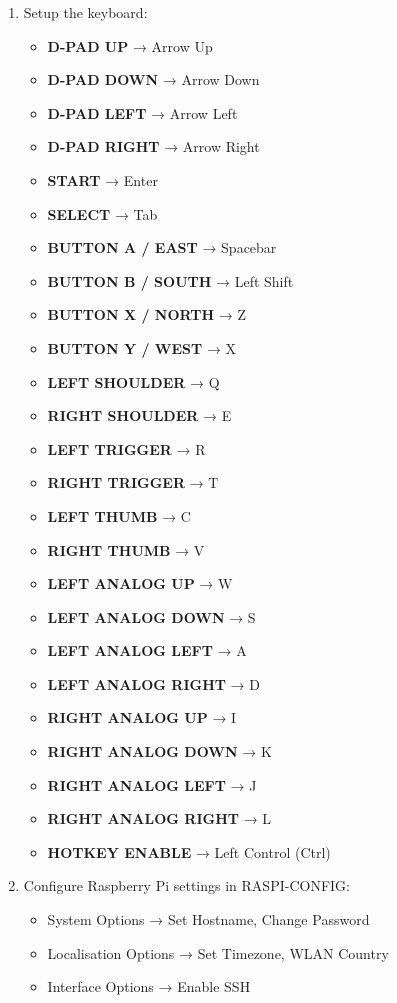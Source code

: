 \begin{enumerate}
\item Setup the keyboard:  
\begin{itemize}
    \item \textbf{D-PAD UP} → Arrow Up  
    \item \textbf{D-PAD DOWN} → Arrow Down  
    \item \textbf{D-PAD LEFT} → Arrow Left  
    \item \textbf{D-PAD RIGHT} → Arrow Right  
    \item \textbf{START} → Enter  
    \item \textbf{SELECT} → Tab  
    \item \textbf{BUTTON A / EAST} → Spacebar  
    \item \textbf{BUTTON B / SOUTH} → Left Shift  
    \item \textbf{BUTTON X / NORTH} → Z  
    \item \textbf{BUTTON Y / WEST} → X  
    \item \textbf{LEFT SHOULDER} → Q  
    \item \textbf{RIGHT SHOULDER} → E  
    \item \textbf{LEFT TRIGGER} → R  
    \item \textbf{RIGHT TRIGGER} → T  
    \item \textbf{LEFT THUMB} → C  
    \item \textbf{RIGHT THUMB} → V  
    \item \textbf{LEFT ANALOG UP} → W  
    \item \textbf{LEFT ANALOG DOWN} → S  
    \item \textbf{LEFT ANALOG LEFT} → A  
    \item \textbf{LEFT ANALOG RIGHT} → D  
    \item \textbf{RIGHT ANALOG UP} → I  
    \item \textbf{RIGHT ANALOG DOWN} → K  
    \item \textbf{RIGHT ANALOG LEFT} → J  
    \item \textbf{RIGHT ANALOG RIGHT} → L  
    \item \textbf{HOTKEY ENABLE} → Left Control (Ctrl)  
\end{itemize}

\item Configure Raspberry Pi settings in RASPI-CONFIG:
\begin{itemize}
\item System Options → Set Hostname, Change Password
\item Localisation Options → Set Timezone, WLAN Country
\item Interface Options → Enable SSH
\end{itemize}


\end{enumerate}
